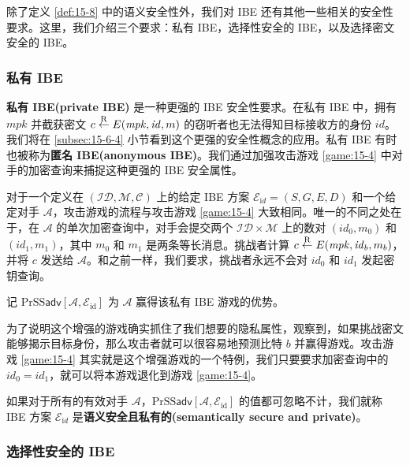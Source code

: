 除了定义 \ref{def:15-8} 中的语义安全性外，我们对 IBE 还有其他一些相关的安全性要求。这里，我们介绍三个要求：私有 IBE，选择性安全的 IBE，以及选择密文安全的 IBE。

\subsubsection{私有 IBE}\label{subsubsec:15-6-2-1}

\textbf{私有 IBE(private IBE)} 是一种更强的 IBE 安全性要求。在私有 IBE 中，拥有 $\mathit{mpk}$ 并截获密文 $c\overset{\rm R}\leftarrow E(\mathit{mpk},\mathit{id},m)$ 的窃听者也无法得知目标接收方的身份 $\mathit{id}$。我们将在 \ref{subsec:15-6-4} 小节看到这个更强的安全性概念的应用。私有 IBE 有时也被称为\textbf{匿名 IBE(anonymous IBE)}。我们通过加强攻击游戏 \ref{game:15-4} 中对手的加密查询来捕捉这种更强的 IBE 安全属性。

\begin{game}[私有 IBE]\label{game:15-5}
对于一个定义在 $(\mathcal{ID},\mathcal{M},\mathcal{C})$ 上的给定 IBE 方案 $\mathcal{E}_{\mathrm{i}d}=(S,G,E,D)$ 和一个给定对手 $\mathcal{A}$，攻击游戏的流程与攻击游戏 \ref{game:15-4} 大致相同。唯一的不同之处在于，在 $\mathcal{A}$ 的单次加密查询中，对手会提交两个 $\mathcal{ID}\times\mathcal{M}$ 上的数对 $(\mathit{id}_0,m_0)$ 和 $(\mathit{id}_1,m_1)$，其中 $m_0$ 和 $m_1$ 是两条等长消息。挑战者计算 $c\overset{\rm R}\leftarrow E(\mathit{mpk},\mathit{id}_b,m_b)$，并将 $c$ 发送给 $\mathcal{A}$。和之前一样，我们要求，挑战者永远不会对 $\mathit{id}_0$ 和 $\mathit{id}_1$ 发起密钥查询。

记 $\mathrm{PrSS}\mathsf{adv}[\mathcal{A},\mathcal{E}_\mathrm{id}]$ 为 $\mathcal{A}$ 赢得该私有 IBE 游戏的优势。
\end{game}

为了说明这个增强的游戏确实抓住了我们想要的隐私属性，观察到，如果挑战密文能够揭示目标身份，那么攻击者就可以很容易地预测比特 $b$ 并赢得游戏。攻击游戏 \ref{game:15-4} 其实就是这个增强游戏的一个特例，我们只要要求加密查询中的 $\mathit{id}_0=\mathit{id}_1$，就可以将本游戏退化到游戏 \ref{game:15-4}。

\begin{definition}[私有 IBE]\label{def:15-9}
如果对于所有的有效对手 $\mathcal{A}$，$\mathrm{PrSS}\mathsf{adv}[\mathcal{A},\mathcal{E}_\mathrm{id}]$ 的值都可忽略不计，我们就称 IBE 方案 $\mathcal{E}_{\mathrm{i}d}$ 是\textbf{语义安全且私有的(semantically secure and private)}。
\end{definition}

\subsubsection{选择性安全的 IBE}\label{subsubsec:15-6-2-2}

